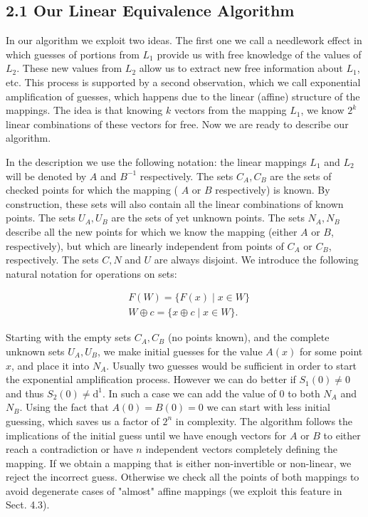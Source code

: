 \documentclass[10pt]{article}
\begin{document}
\subsection*{2.1 Our Linear Equivalence Algorithm}
In our algorithm we exploit two ideas. The first one we call a needlework effect in which guesses of portions from $L_{1}$ provide us with free knowledge of the values of $L_{2}$. These new values from $L_{2}$ allow us to extract new free information about $L_{1}$, etc. This process is supported by a second observation, which we call exponential amplification of guesses, which happens due to the linear (affine) structure of the mappings. The idea is that knowing $k$ vectors from the mapping $L_{1}$, we know $2^{k}$ linear combinations of these vectors for free. Now we are ready to describe our algorithm.

In the description we use the following notation: the linear mappings $L_{1}$ and $L_{2}$ will be denoted by $A$ and $B^{-1}$ respectively. The sets $C_{A}, C_{B}$ are the sets of checked points for which the mapping ( $A$ or $B$ respectively) is known. By construction, these sets will also contain all the linear combinations of known points. The sets $U_{A}, U_{B}$ are the sets of yet unknown points. The sets $N_{A}, N_{B}$ describe all the new points for which we know the mapping (either $A$ or $B$, respectively), but which are linearly independent from points of $C_{A}$ or $C_{B}$, respectively. The sets $C, N$ and $U$ are always disjoint. We introduce the following natural notation for operations on sets:


\begin{align*}
& F(W)=\{F(x) \mid x \in W\}  \tag{1}\\
& W \oplus c=\{x \oplus c \mid x \in W\} . \tag{2}
\end{align*}


Starting with the empty sets $C_{A}, C_{B}$ (no points known), and the complete unknown sets $U_{A}, U_{B}$, we make initial guesses for the value $A(x)$ for some point $x$, and place it into $N_{A}$. Usually two guesses would be sufficient in order to start\\
the exponential amplification process. However we can do better if $S_{1}(0) \neq 0$ and thus $S_{2}(0) \neq \mathrm{d}^{1}$. In such a case we can add the value of 0 to both $N_{A}$ and $N_{B}$. Using the fact that $A(0)=B(0)=0$ we can start with less initial guessing, which saves us a factor of $2^{n}$ in complexity. The algorithm follows the implications of the initial guess until we have enough vectors for $A$ or $B$ to either reach a contradiction or have $n$ independent vectors completely defining the mapping. If we obtain a mapping that is either non-invertible or non-linear, we reject the incorrect guess. Otherwise we check all the points of both mappings to avoid degenerate cases of "almost" affine mappings (we exploit this feature in Sect. 4.3).
\end{document}

